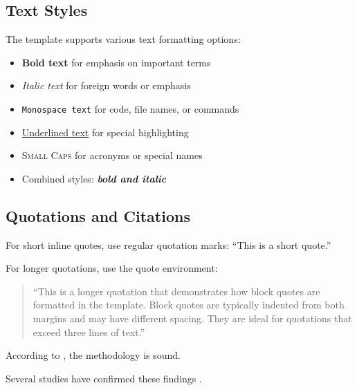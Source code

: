 \subsection{Text Styles}
\label{subsec:text_styles}

The template supports various text formatting options:

\begin{itemize}
	\item \textbf{Bold text} for emphasis on important terms
	\item \textit{Italic text} for foreign words or emphasis
	\item \texttt{Monospace text} for code, file names, or commands
	\item \underline{Underlined text} for special highlighting
	\item \textsc{Small Caps} for acronyms or special names
	\item Combined styles: \textbf{\textit{bold and italic}}
\end{itemize}

\subsection{Quotations and Citations}
\label{subsec:quotations}

For short inline quotes, use regular quotation marks: ``This is a short quote.''

For longer quotations, use the quote environment:

\begin{quote}
	``This is a longer quotation that demonstrates how block quotes are formatted
	in the template. Block quotes are typically indented from both margins and
	may have different spacing. They are ideal for quotations that exceed
	three lines of text.'' \cite{example2023}
\end{quote}

According to \textcite[p.~42]{examplebook2022}, the methodology is sound.

Several studies have confirmed these findings \parencite{example2023, conference2023}.

